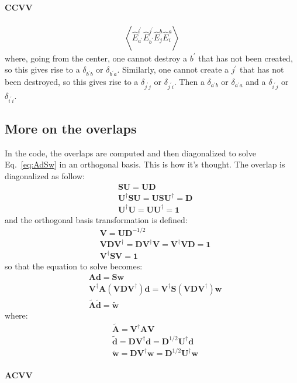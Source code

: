 \documentclass{article}
\newcommand  \equ[2]       {\begin{align}#2\label{#1}\end{align}}
\renewcommand\b[1]         {\mathbf{#1}}
\newcommand  \Expect[1]    {\left\langle  #1 \right\rangle}
\newcommand  \E[2]         {\hat{E}_{#1}^{#2}}
\renewcommand\P            {^\prime}
\begin{document}
\paragraph{CCVV}
\equ{ }{
  \Expect{ \E{a\P}{i\P}\E{b\P}{j\P}\E{j}{b}\E{i}{a}}
}
where, going from the center, one cannot destroy a $b\P$ that has not been created, so this gives rise to a $\delta_{b\P b}$ or $\delta_{b\P a}$.
Similarly, one cannot create a $j\P$ that has not been destroyed, so this gives rise to a $\delta_{j\P j}$ or $\delta_{j\P i}$.
Then a $\delta_{a\P b}$ or $\delta_{a\P a}$ and a $\delta_{i\P j}$ or $\delta_{i\P i}$.


\subsection{More on the overlaps}
\label{sec:overlaps}

In the code, the overlaps are computed and then diagonalized to solve Eq.~\ref{eq:AdSw} in an orthogonal basis. This is how it's thought.
The overlap is diagonalized as follow:
\equ{}{&
  \b{S}\b{U}=\b{U}\b{D}
     \\&
  \b{U}^\dagger\b{S}\b{U}=\b{U}\b{S}\b{U}^\dagger=\b{D}
     \\&
  \b{U}^\dagger\b{U}=\b{U}\b{U}^\dagger=\b{1}
}
and the orthogonal basis transformation is defined:
\equ{}{&
  \b{V}=\b{U}\b{D}^{-1/2}
     \\&
  \b{V}\b{D}\b{V}^\dagger=\b{D}\b{V}^\dagger \b{V}=\b{V}^\dagger \b{V}\b{D}=\b{1}
     \\&
  \b{V}^\dagger\b{S}\b{V}=\b{1}
}
so that the equation to solve becomes:
\equ{}{&
  \b{A}\b{d}=\b{S}\b{w}
     \\&
  \b{V}^\dagger \b{A} (\b{V}\b{D}\b{V}^\dagger) \b{d} = \b{V}^\dagger \b{S} (\b{V}\b{D}\b{V}^\dagger) \b{w}
     \\&
  \tilde{\b{A}} \tilde{\b{d}} = \tilde{\b{w}}
}
where:
\equ{}{&
  \tilde{\b{A}}=\b{V}^\dagger \b{A} \b{V}
     \\&
  \tilde{\b{d}}=\b{D}\b{V}^\dagger \b{d}=\b{D}^{1/2}\b{U}^\dagger \b{d}
     \\&
  \tilde{\b{w}}=\b{D}\b{V}^\dagger \b{w}=\b{D}^{1/2}\b{U}^\dagger \b{w}
}

\paragraph{ACVV}
\end{document}
